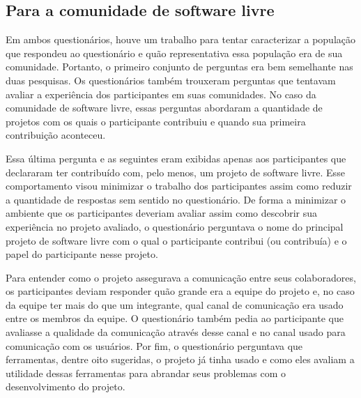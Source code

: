 \subsection{Para a comunidade de software livre}
\label{subsec:floss}

Em ambos questionários, houve um trabalho para tentar caracterizar a
população que respondeu ao questionário e quão representativa essa
população era de sua comunidade. Portanto, o primeiro conjunto de
perguntas era bem semelhante nas duas pesquisas. Os questionários
também trouxeram perguntas que tentavam avaliar a experiência dos
participantes em suas comunidades. No caso da comunidade de software
livre, essas perguntas abordaram a quantidade de projetos com os quais
o participante contribuiu e quando sua primeira contribuição
aconteceu.

Essa última pergunta e as seguintes eram exibidas apenas aos
participantes que declararam ter contribuído com, pelo menos, um
projeto de software livre. Esse comportamento visou minimizar o
trabalho dos participantes assim como reduzir a quantidade de
respostas sem sentido no questionário. De forma a minimizar o ambiente
que os participantes deveriam avaliar assim como descobrir sua
experiência no projeto avaliado, o questionário perguntava o nome do
principal projeto de software livre com o qual o participante
contribui (ou contribuía) e o papel do participante nesse projeto.

Para entender como o projeto assegurava a comunicação entre seus
colaboradores, os participantes deviam responder quão grande era a
equipe do projeto e, no caso da equipe ter mais do que um integrante,
qual canal de comunicação era usado entre os membros da equipe. O
questionário também pedia ao participante que avaliasse a qualidade da
comunicação através desse canal e no canal usado para comunicação com
os usuários.  Por fim, o questionário perguntava que ferramentas,
dentre oito sugeridas, o projeto já tinha usado e como eles avaliam a
utilidade dessas ferramentas para abrandar seus problemas com o
desenvolvimento do projeto.


